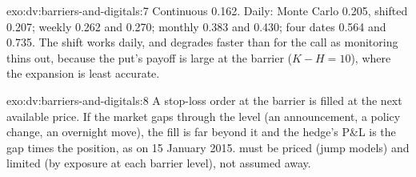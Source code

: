 \begin{solution}{exo:dv:barriers-and-digitals:7}
Continuous 0.162. Daily: Monte Carlo 0.205, shifted 0.207; weekly 0.262 and 0.270; monthly 0.383 and 0.430; four dates 0.564
and 0.735. The shift works daily, and degrades faster than for the call as monitoring thins out, because the put's
payoff is large at the barrier ($K-H=10$), where the expansion is least accurate.
\end{solution}

\begin{solution}{exo:dv:barriers-and-digitals:8}
A stop-loss order at the barrier is filled at the next available price. If the market gaps through the level (an
announcement, a policy change, an overnight move), the fill is far beyond it and the hedge's P\&L is the gap times the
position, as on 15 January 2015.  must be priced (jump models) and limited (by exposure at each barrier level),
not assumed away.
\end{solution}

